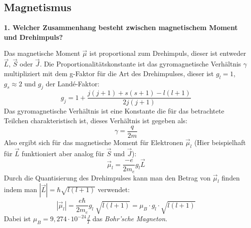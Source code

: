 \subsection{Magnetismus}

\noindent\textbf{1. Welcher Zusammenhang besteht zwischen magnetischem Moment und Drehimpuls?}\\
\begin{addmargin}[25pt]{0pt}
Das magnetische Moment $\vec{\mu}$ ist proportional zum Drehimpuls, dieser ist entweder $\Vec{L}$, $\Vec{S}$ oder $\Vec{J}$. Die Proportionalitätskonstante ist das gyromagnetische Verhältnis $\gamma$ multipliziert mit dem g-Faktor für die Art des Drehimpulses, dieser ist $g_l = 1$, $g_s \approx 2$ und $g_j$ der Landé-Faktor:
\begin{equation}\label{eq:Landé-Faktor}
    g_j = 1 + \frac{j(j+1) + s(s+1) - l(l+1)}{2j(j+1)}
\end{equation}
Das gyromagnetische Verhältnis ist eine Konstante die für das betrachtete Teilchen charakteristisch ist, dieses Verhältnis ist gegeben als:
\begin{equation}\label{eq:gyromagnetisches Verhältnis}
    \gamma = \frac{q}{2m}
\end{equation}
Also ergibt sich für das magnetische Moment für Elektronen $\Vec{\mu}_l$ (Hier beispielhaft für $\Vec{L}$ funktioniert aber analog für $\Vec{S}$ und $\Vec{J}$):
\begin{equation}\label{eq:magnetisches_Moment_Drehimpuls}
    \Vec{\mu}_l = \frac{-e}{2m_e}g_l\Vec{L}
\end{equation}
Durch die Quantisierung des Drehimpulses kann man den Betrag von $\vec{\mu}_l$ finden indem man $|\Vec{L}| = \hbar\sqrt{l(l+1)}$ verwendet:
\begin{equation}\label{eq:Betrag_magnetisches_Moment_Drehimpuls}
    |\Vec{\mu}_l| = \frac{e\hbar}{2m_e}g_l\;\sqrt{l(l+1)} = \mu_B\cdot g_l \cdot\sqrt{l(l+1)}
\end{equation}
Dabei ist $\mu_B = 9,274\cdot 10^{-24} \frac{\si{J}}{\si{T}}$ das \textit{Bohr'sche Magneton}.\\

\end{addmargin}

